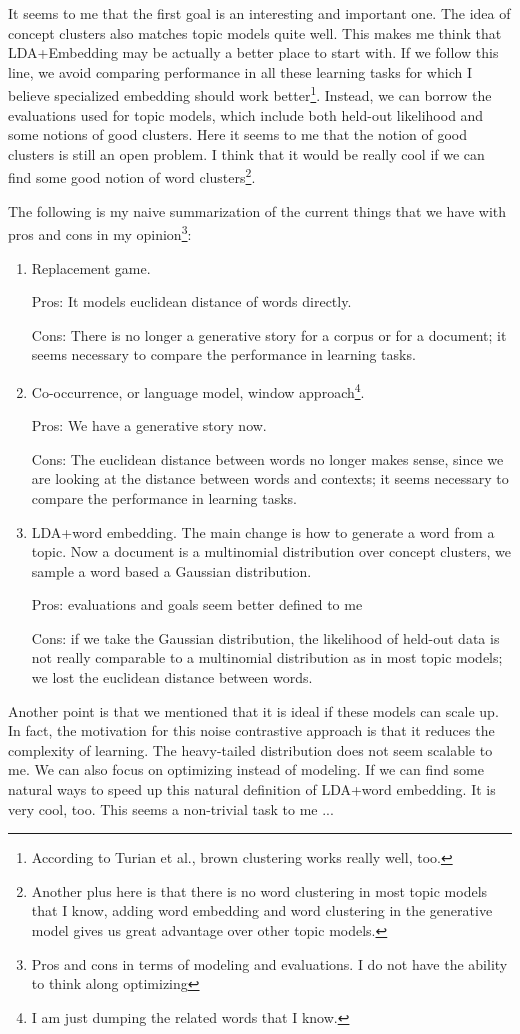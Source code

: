 \documentclass[letterpaper]{article}
\begin{document}
It seems to me that the first goal is an interesting and important one. The idea of concept clusters also matches topic models quite well.
This makes me think that LDA+Embedding may be actually a better place to start with.
If we follow this line, we avoid comparing performance in all these learning tasks for which I believe specialized embedding should work better\footnote{According to Turian et al., brown clustering works really well, too.}.
Instead, we can borrow the evaluations used for topic models, which include both held-out likelihood and some notions of good clusters.
Here it seems to me that the notion of good clusters is still an open problem.
I think that it would be really cool if we can find some good notion of word clusters\footnote{Another plus here is that there is no word clustering in most topic models that I know, adding word embedding and word clustering in the generative model gives us great advantage over other topic models.}.

The following is my naive summarization of the current things that we have with pros and cons in my opinion\footnote{Pros and cons in terms of modeling and evaluations. I do not have the ability to think along optimizing}:

\begin{enumerate}
\item Replacement game.

Pros: It models euclidean distance of words directly.

Cons: There is no longer a generative story for a corpus or for a document;
it seems necessary to compare the performance in learning tasks.

\item Co-occurrence, or language model, window approach\footnote{I am just dumping the related words that I know.}. 

Pros: We have a generative story now.

Cons: The euclidean distance between words no longer makes sense, since we are looking at the distance between words and contexts;
it seems necessary to compare the performance in learning tasks.

\item LDA+word embedding. The main change is how to generate a word from a topic. Now a document is a multinomial distribution over concept clusters, we sample a word based a Gaussian distribution.

Pros: evaluations and goals seem better defined to me

Cons: if we take the Gaussian distribution, the likelihood of held-out data is not really comparable to a multinomial distribution as in most topic models; we lost the euclidean distance between words.
\end{enumerate}


Another point is that we mentioned that it is ideal if these models can scale up. In fact, the motivation for this noise contrastive approach is that it reduces the complexity of learning.
The heavy-tailed distribution does not seem scalable to me.
We can also focus on optimizing instead of modeling.
If we can find some natural ways to speed up this natural definition of LDA+word embedding. It is very cool, too.
This seems a non-trivial task to me ...
\end{document}
